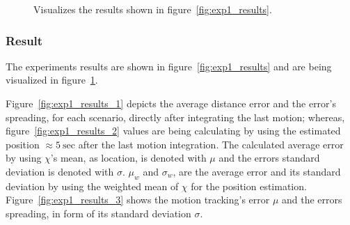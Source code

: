 \begin{figure}
\caption{Visualizes the results shown in figure~\ref{fig:exp1_results}.}
\label{fig:exp1_visualization}
\end{figure}

\subsubsection*{Result}
The experiments results are shown in figure~\ref{fig:exp1_results} and are being visualized in figure~\ref{fig:exp1_visualization}.

Figure~\ref{fig:exp1_results_1} depicts the average distance error and the error's spreading, for each scenario, directly after integrating the last motion; whereas, figure~\ref{fig:exp1_results_2} values are being calculating by using the estimated position $\approx 5~\text{sec}$ after the last motion integration. The calculated average error by using $\chi$'s mean, as location, is denoted with $\mu$ and the errors standard deviation is denoted with $\sigma$. $\mu_w$ and $\sigma_w$, are the average error and its standard deviation by using the weighted mean of $\chi$ for the position estimation.
Figure~\ref{fig:exp1_results_3} shows the motion tracking's error $\mu$ and the errors spreading, in form of its standard deviation $\sigma$.


